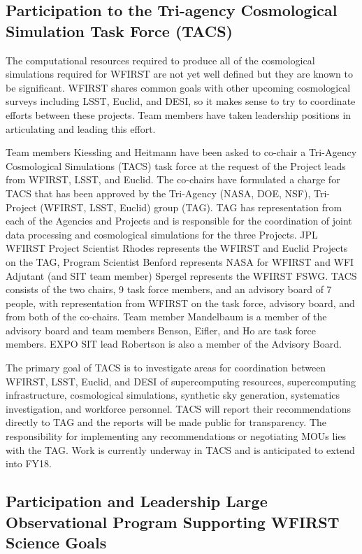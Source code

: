 \subsection{Participation to the Tri-agency  Cosmological Simulation Task Force (TACS)}
\label{sec:tacs}
The computational resources required to produce all of the cosmological simulations required for WFIRST are not yet well defined but they are known to be significant. WFIRST shares common goals with other upcoming cosmological surveys including LSST, Euclid, and DESI, so it makes sense to try to coordinate efforts between these projects. Team members have taken leadership positions in articulating and leading this effort.

Team members Kiessling and Heitmann have been asked to co-chair a Tri-Agency Cosmological Simulations (TACS) task force at the request of the Project leads from WFIRST, LSST, and Euclid. The co-chairs have formulated a charge for TACS that has been approved by the Tri-Agency (NASA, DOE, NSF), Tri-Project (WFIRST, LSST, Euclid) group (TAG). TAG has representation from each of the Agencies and Projects and is responsible for the coordination of joint data processing and cosmological simulations for the three Projects. JPL WFIRST Project Scientist Rhodes represents the WFIRST and Euclid Projects on the TAG, Program Scientist Benford represents NASA for WFIRST and WFI Adjutant (and SIT team member) Spergel represents the WFIRST FSWG. TACS consists of the two chairs, 9 task force members, and an advisory board of 7 people, with representation from WFIRST on the task force, advisory board, and from both of the co-chairs. Team member Mandelbaum is a member of the advisory board and team members Benson, Eifler, and Ho are task force members. EXPO SIT lead Robertson is also a member of the Advisory Board.

The primary goal of TACS is to investigate areas for coordination between WFIRST, LSST, Euclid, and DESI of supercomputing resources, supercomputing infrastructure, cosmological simulations, synthetic sky generation, systematics investigation, and workforce personnel. TACS will report their recommendations directly to TAG and the reports will be made public for transparency. The responsibility for implementing any recommendations or negotiating MOUs lies with the TAG. Work is currently underway in TACS and is anticipated to extend into FY18.

\subsection{Participation and Leadership Large Observational Program Supporting WFIRST Science Goals}

